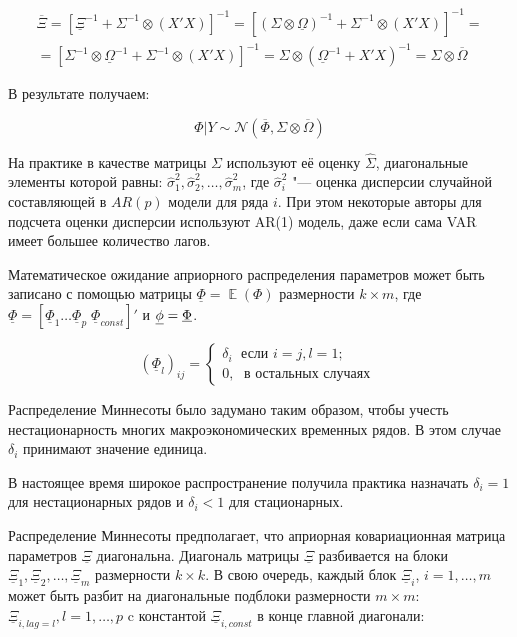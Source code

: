 \documentclass[11pt]{article} %
\DeclareMathOperator{\E}{\mathbb{E}}
\newcommand{\cN}{\mathcal{N}}
\newcommand{\prior}{\underline}
\newcommand{\post}{\overline}
\let\vec\relax
\DeclareMathOperator{\vec}{vec}
\begin{document}
\begin{multline}
\post \Xi=[\prior \Xi^{-1}+\Sigma^{-1}\otimes(X'X)]^{-1}=[(\Sigma \otimes \prior\Omega)^{-1}+\Sigma^{-1}\otimes(X'X)]^{-1}=\\
=[\Sigma^{-1}\otimes  \prior\Omega^{-1} +\Sigma^{-1}\otimes(X'X)]^{-1}=\Sigma \otimes (\prior\Omega^{-1}+ X'X)^{-1} = \Sigma \otimes \post \Omega
\end{multline}

В результате получаем:

\[
\Phi | Y \sim \cN (\post\Phi, \Sigma \otimes \post\Omega)
\]

На практике в качестве матрицы $\Sigma$ используют её оценку $\hat\Sigma$, диагональные элементы которой равны: $\hat\sigma_{1}^2, \hat\sigma_{2}^2,\ldots,\hat\sigma_{m}^2 $, где  $\hat\sigma_{i}^2$ "--- оценка дисперсии случайной составляющей в $AR(p)$ модели для ряда $i$. При этом некоторые авторы для подсчета оценки дисперсии используют AR(1) модель, даже если сама VAR имеет большее количество лагов.

Математическое ожидание априорного распределения параметров может быть записано с помощью матрицы $\prior \Phi = \E (\Phi)$ размерности $k\times m$, где $\prior\Phi=[\prior\Phi_1 \ldots \prior\Phi_p \; \prior\Phi_{const}]'$ и $\prior \phi = \vec{ \prior \Phi}$.


\begin{equation}
(\prior\Phi_l)_{ij}=
\begin{cases}
\delta_i\; \mbox{ если } i=j, l=1;\\
0,\;\text{ в остальных случаях }
\end{cases}\label{minnesota_exp}
\end{equation}


Распределение Миннесоты было задумано таким образом, чтобы учесть нестационарность многих макроэкономических временных рядов. В этом случае $\delta_{i}$ принимают значение единица.

В настоящее время широкое распространение получила практика назначать $\delta_{i}=1$ для нестационарных рядов и $\delta_{i}<1$ для стационарных.

Распределение Миннесоты предполагает, что априорная ковариационная матрица параметров $\prior \Xi$ диагональна. Диагональ матрицы $\prior \Xi$ разбивается на блоки  $\prior \Xi_1,\prior \Xi_2, \ldots, \prior \Xi_m$ размерности $k\times k$. В свою очередь, каждый блок $\prior \Xi_i$, $i=1,\ldots,m$ может быть разбит на диагональные подблоки размерности $m\times m$: $\prior \Xi_{i,lag=l}, l=1,\ldots, p$ c константой $\prior \Xi_{i,const}$  в конце главной диагонали:
\end{document}
